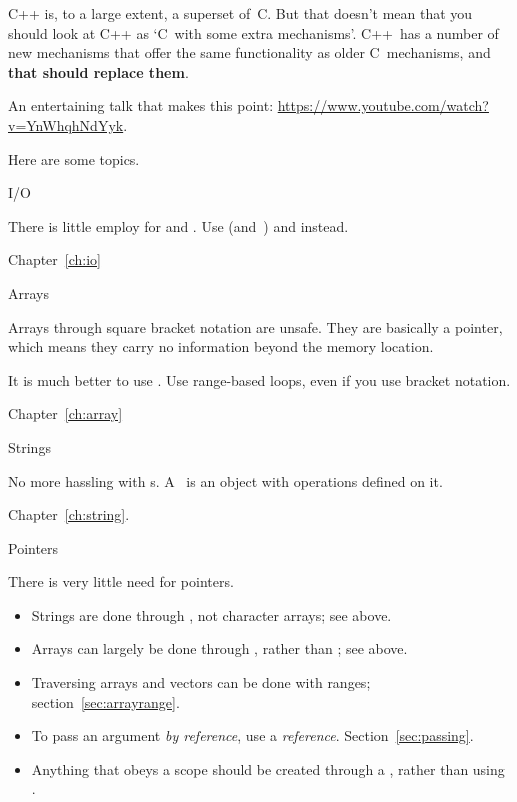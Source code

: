 
C++ is, to a large extent, a superset of~C. But that doesn't mean that
you should look at C++ as `C~with some extra mechanisms'. C++~has a
number of new mechanisms that offer the same functionality as older
C~mechanisms, and \textbf{that should replace them}.

An entertaining talk that makes this point:
\url{https://www.youtube.com/watch?v=YnWhqhNdYyk}.

Here are some topics.

 {I/O}

There is little employ for  and
. Use  (and~)
and  instead.

Chapter~\ref{ch:io}

 {Arrays}

Arrays through square bracket notation are unsafe. They are basically
a pointer, which means they carry no information beyond the memory location.

It is much better
to use . Use range-based loops, even if you use
bracket notation.

Chapter~\ref{ch:array}

 {Strings}

No more hassling with s. A~ is an object with operations
defined on it.

Chapter~\ref{ch:string}.

 {Pointers}

There is very little need for pointers.
\begin{itemize}
\item Strings are done through , not character arrays;
  see above.
\item Arrays can largely be done through , rather than
  ; see above.
\item Traversing arrays and vectors can be done with ranges;
  section~\ref{sec:arrayrange}.
\item To pass an argument
  \emph{by reference},
  use a \emph{reference}.
  Section~\ref{sec:passing}.
\item Anything that obeys a scope should be created through a
  , rather than using .
\end{itemize}

